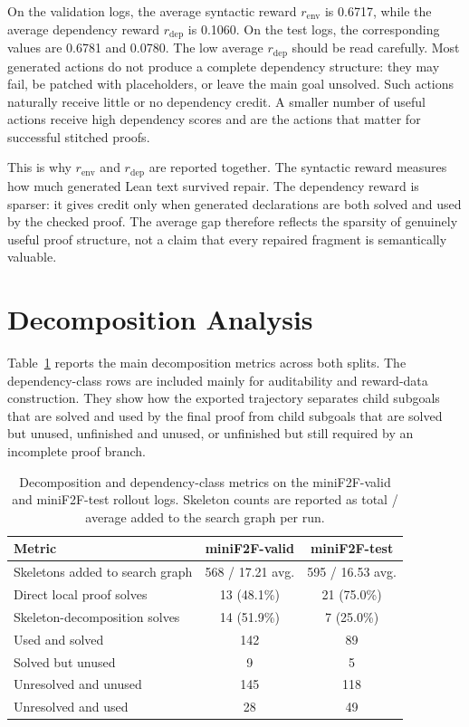 \documentclass[en]{uet_awesome_thesis/uet-awesome-thesis}
\begin{document}
On the validation logs, the average syntactic reward \(r_{\mathrm{env}}\) is 0.6717, while the average
dependency reward \(r_{\mathrm{dep}}\) is 0.1060. On the test logs, the corresponding values are 0.6781
and 0.0780. The low average \(r_{\mathrm{dep}}\) should be read carefully. Most generated actions do not
produce a complete dependency structure: they may fail, be patched with placeholders, or leave the main
goal unsolved. Such actions naturally receive little or no dependency credit. A smaller number of useful
actions receive high dependency scores and are the actions that matter for successful stitched proofs.

This is why \(r_{\mathrm{env}}\) and \(r_{\mathrm{dep}}\) are reported together. The syntactic reward measures
how much generated Lean text survived repair. The dependency reward is sparser: it gives credit only
when generated declarations are both solved and used by the checked proof. The average gap therefore
reflects the sparsity of genuinely useful proof structure, not a claim that every repaired fragment is
semantically valuable.

\section{Decomposition Analysis}

Table~\ref{tab:deep-metrics} reports the main decomposition metrics across both splits. The
dependency-class rows are included mainly for auditability and reward-data construction. They show how
the exported trajectory separates child subgoals that are solved and used by the final proof from child
subgoals that are solved but unused, unfinished and unused, or unfinished but still required by an
incomplete proof branch.

\begin{table}[h]
\centering
\scriptsize
\setlength{\tabcolsep}{4pt}
\begin{tabular}{@{}lcc@{}}
\toprule
Metric & miniF2F-valid & miniF2F-test \\
\midrule
Skeletons added to search graph & 568 / 17.21 avg. & 595 / 16.53 avg. \\
Direct local proof solves & 13 (48.1\%) & 21 (75.0\%) \\
Skeleton-decomposition solves & 14 (51.9\%) & 7 (25.0\%) \\
Used and solved & 142 & 89 \\
Solved but unused & 9 & 5 \\
Unresolved and unused & 145 & 118 \\
Unresolved and used & 28 & 49 \\
\bottomrule
\end{tabular}
\caption{Decomposition and dependency-class metrics on the miniF2F-valid and miniF2F-test rollout logs. Skeleton counts are reported as total / average added to the search graph per run.}
\label{tab:deep-metrics}
\end{table}
\end{document}
